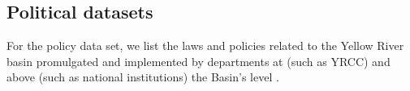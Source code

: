 \documentclass[9pt,twoside,lineno]{pnas-new}
\begin{document}
\subsection*{Political datasets}
For the policy data set, we list the laws and policies related to the Yellow River basin promulgated and implemented by departments at (such as YRCC) and above (such as national institutions) the Basin's level  \cite{yellowriverconservancycommissionYellowRiverBasin2013}. 


\newpage
\end{document}
